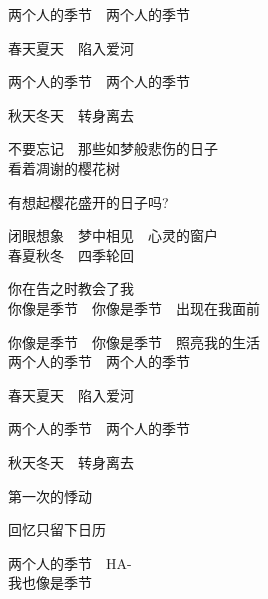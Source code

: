 两个人的季节　两个人的季节

春天夏天　陷入爱河

两个人的季节　两个人的季节

秋天冬天　转身离去

不要忘记　那些如梦般悲伤的日子
\\

看着凋谢的樱花树

有想起樱花盛开的日子吗?

闭眼想象　梦中相见　心灵的窗户
\\

春夏秋冬　四季轮回

你在告之时教会了我
\\

你像是季节　你像是季节　出现在我面前

你像是季节　你像是季节　照亮我的生活
\\

两个人的季节　两个人的季节

春天夏天　陷入爱河

两个人的季节　两个人的季节

秋天冬天　转身离去

第一次的悸动

回忆只留下日历

两个人的季节　HA-
\\

我也像是季节
